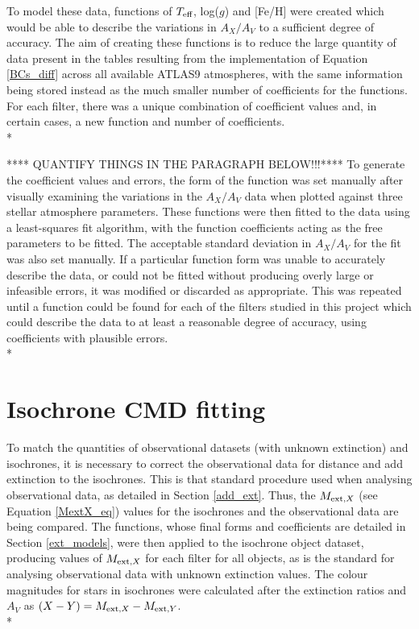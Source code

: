 \documentclass[12pt, a4paper]{report}
\begin{document}
To model these data, functions of $T_{\textnormal{eff}}$, log($g$) and [Fe/H] were created which would be able to describe the variations in $A_{X}/A_{V}$ to a sufficient degree of accuracy. The aim of creating these functions is to reduce the large quantity of data present in the tables resulting from the implementation of Equation \ref{BCs_diff} across all available ATLAS9 atmospheres, with the same information being stored instead as the much smaller number of coefficients for the functions. For each filter, there was a unique combination of coefficient values and, in certain cases, a new function and number of coefficients.\\*

**** QUANTIFY THINGS IN THE PARAGRAPH BELOW!!!****
To generate the coefficient values and errors, the form of the function was set manually after visually examining the variations in the $A_{X}/A_{V}$ data when plotted against three stellar atmosphere parameters. These functions were then fitted to the data using a least-squares fit algorithm, with the function coefficients acting as the free parameters to be fitted. The acceptable standard deviation in $A_{X}/A_{V}$ for the fit was also set manually. If a particular function form was unable to accurately describe the data, or could not be fitted without producing overly large or infeasible errors, it was modified or discarded as appropriate. This was repeated until a function could be found for each of the filters studied in this project which could  describe the data to at least a reasonable degree of accuracy, using coefficients with plausible errors.\\*

\section{Isochrone CMD fitting} \label{isoc_fit} 

To match the quantities of observational datasets (with unknown extinction) and isochrones, it is necessary to correct the observational data for distance and add extinction to the isochrones. This is that standard procedure used when analysing observational data, as detailed in Section \ref{add_ext}. Thus, the $M_{\textnormal{ext},X}$ (see Equation \ref{MextX_eq}) values for the isochrones and the observational data are being compared. The functions, whose final forms and coefficients are detailed in Section \ref{ext_models}, were then applied to the isochrone object dataset, producing values of $M_{\textnormal{ext},X}$ for each filter for all objects, as is the standard for analysing observational data with unknown extinction values. The colour magnitudes for stars in isochrones were calculated after the extinction ratios and $A_{V}$ as $(X-Y) = M_{\textnormal{ext},X} - M_{\textnormal{ext},Y}$.\\*
\end{document}
